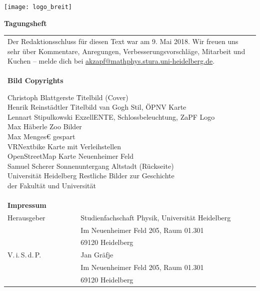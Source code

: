 \documentclass[a5paper]{scrbook}
\begin{document}
\pagestyle{empty}
\centering
\texttt{[image: logo\_breit]} 

\vspace*{14cm} \centering \fontsize{40}{48} \textbf{Tagungsheft}
\normalsize

      
\null
\newpage
{}
\vspace*{\fill}
    \begin{tabular*}{\textwidth}{ll}
        \multicolumn{2}{l}{
            \parbox{\textwidth}{
                Der Redaktionsschluss für diesen Text war am 9. Mai 2018. Wir freuen uns
                sehr über Kommentare, Anregungen, Verbesserungsvorschläge,
                Mitarbeit und Kuchen -- melde dich bei
                \href{mailto:akzapf@mathphys.stura.uni-heidelberg.de}{akzapf@mathphys.stura.uni-heidelberg.de}.
            }
            \vspace{1cm}
        }\\
	\multicolumn{2}{l}{
	\parbox{0.77\textwidth}{
       	\textbf{Bild Copyrights}
       	\begin{tabbing}
		Christoph Blattgerste \quad \quad \=  Titelbild (Cover)\\		
		Henrik Reinstädtler\> Titelbild van Gogh Stil, ÖPNV Karte\\
		Lennart Stipulkowski \> ExzellENTE, Schlossbeleuchtung, ZaPF Logo\\
		Max Häberle \> Zoo Bilder\\
		Max Menges€ gespart \\		
		VRNextbike \> Karte mit Verleihstellen\\
		OpenStreetMap \> Karte Neuenheimer Feld\\
		Samuel Scherer \> Sonnenuntergang Altstadt (Rückseite)\\
		Universität Heidelberg \> Restliche Bilder zur Geschichte\\
		\>der Fakultät und Universität\\
		

		\end{tabbing}
       	}
      }\\  
        
        \textbf{Impressum} &\\
        Herausgeber & Studienfachschaft Physik, Universität Heidelberg \\
        & Im Neuenheimer Feld 205, Raum 01.301\\
        & 69120 Heidelberg\\
        V.\,i.\,S.\,d.\,P. & Jan Gräfje\\
        & Im Neuenheimer Feld 205, Raum 01.301\\
        & 69120 Heidelberg\\
    \end{tabular*}
\end{document}
